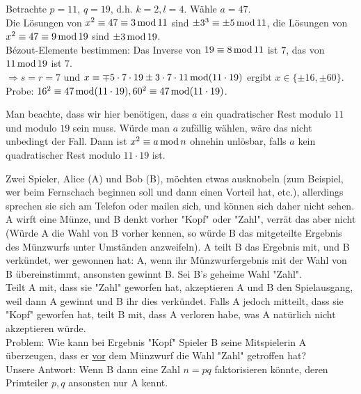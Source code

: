 \begin{bsp}
	Betrachte $p = 11$, $q = 19$, d.h. $k = 2, l = 4$. 
	Wähle $a = 47$. \\
	Die Lösungen von $x^2 \equiv 47 \equiv 3 \operatorname{mod} 11$ sind $\pm 3^3 \equiv \pm 5 \operatorname{mod} 11$, die Lösungen von $x^2 \equiv 47 \equiv 9 \operatorname{mod} 19$ sind $\pm 3 \operatorname{mod} 19$. \\
	Bézout-Elemente bestimmen: Das Inverse von $19 \equiv 8 \operatorname{mod} 11$ ist $7$, das von $11 \operatorname{mod} 19$ ist $7$. \\
	$\Rightarrow s = r = 7$ und $x \equiv \mp 5 \cdot 7 \cdot 19 \pm 3 \cdot 7 \cdot 11 \operatorname{mod} (11 \cdot 19)$ ergibt $x \in \{\pm 16, \pm 60\}$.\\
	Probe: $16^2 \equiv 47 \operatorname{mod} (11 \cdot 19), 60^2 \equiv 47 \operatorname{mod} (11 \cdot 19)$. \checkmark
\end{bsp}

Man beachte, dass wir hier benötigen, dass $a$ ein quadratischer Rest modulo $11$ und modulo $19$ sein muss. 
Würde man $a$ zufällig wählen, wäre das nicht unbedingt der Fall. 
Dann ist $x^2 \equiv a \operatorname{mod} n$ ohnehin unlösbar, falls $a$ kein quadratischer Rest modulo $11 \cdot 19$ ist.

\begin{anw}
	Zwei Spieler, Alice (A) und Bob (B), möchten etwas ausknobeln (zum Beispiel, wer beim Fernschach beginnen soll und dann einen Vorteil hat, etc.), allerdings sprechen sie sich am Telefon oder mailen sich, und können sich daher nicht sehen. 
	A wirft eine Münze, und B denkt vorher "Kopf" oder "Zahl", verrät das aber nicht (Würde A die Wahl von B vorher kennen, so würde B das mitgeteilte Ergebnis des Münzwurfs unter Umständen anzweifeln). 
	A teilt B das Ergebnis mit, und B verkündet, wer gewonnen hat: A, wenn ihr Münzwurfergebnis mit der Wahl von B übereinstimmt, ansonsten gewinnt B. 
	Sei B's geheime Wahl "Zahl". \\
	Teilt A mit, dass sie "Zahl" geworfen hat, akzeptieren A und B den Spielausgang, weil dann A gewinnt und B ihr dies verkündet. 
	Falls A jedoch mitteilt, dass sie "Kopf" geworfen hat, teilt B mit, dass A verloren habe, was A natürlich nicht akzeptieren würde.\\
	Problem: Wie kann bei Ergebnis "Kopf" Spieler B seine Mitspielerin A überzeugen, dass er \underline{vor} dem Münzwurf die Wahl "Zahl" getroffen hat? \\
	Unsere Antwort: Wenn B dann eine Zahl $n = pq$ faktorisieren könnte, deren Primteiler $p,q$ ansonsten nur A kennt.
\end{anw}

